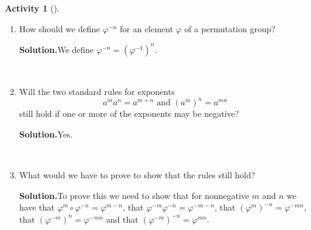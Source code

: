 \documentclass[10pt,]{book}
\theoremstyle{plain}
\theoremstyle{definition}
\newtheorem{activity}[project]{Activity}
\numberwithin{equation}{chapter}
\begin{document}
\begin{activity}[]\label{activity-256}
~\par
\begin{enumerate}[label=(\alph*)]
 \item How should we define \(\varphi^{-n}\) for an element \(\varphi\) of a permutation group?%
\par\medskip\noindent%
\textbf{Solution.}\quad We define \(\varphi^{-n}=\left(\varphi^{-1}\right)^n\).%

~\par
\item Will the two standard rules for exponents%
\begin{equation*}
a^ma^n=a^{m+n} \mbox{\ and\ }  (a^m)^n = a^{mn}
\end{equation*}
still hold if one or more of the exponents may be negative?%
\par\medskip\noindent%
\textbf{Solution.}\quad Yes.%

~\par
\item What would we have to prove to show that the rules still hold?%
\par\medskip\noindent%
\textbf{Solution.}\quad To prove this we need to show that for nonnegative \(m\) and \(n\) we have that \(\varphi^m\circ\varphi^{-n} =
\varphi^{m-n}\), that \(\varphi^{-m}\varphi^{-n} = \varphi^{-m-n}\), that \((\varphi^m)^{-n} = \varphi^{-mn}\), that \((\varphi^{-m})^n = \varphi^{-mn}\) and that \((\varphi^{-m})^{-n}= \varphi^{mn}\).%


\end{enumerate}
\end{activity}
\end{document}
